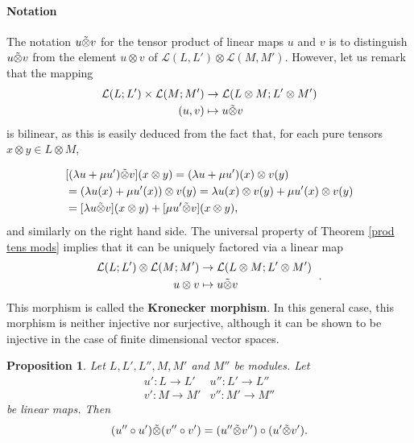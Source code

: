 \documentclass{report}
\newtheorem{prop}{Proposition}
\theoremstyle{definition}
\theoremstyle{remark}
\begin{document}
\paragraph{Notation} The notation $u \Tilde{\otimes} v$ for the tensor product of linear maps $u$ and $v$ is to distinguish $u \Tilde{\otimes} v$ from the element $u \otimes v$ of $\mathcal{L}(L,L') \otimes \mathcal{L}(M,M')$. However, let us remark that the mapping
\begin{equation*}
    \begin{split}
        \mathcal{L}(L;L') \times \mathcal{L}(M;M') & \to \mathcal{L}(L\otimes M; L' \otimes M') \\
        (u,v) & \mapsto u \Tilde{\otimes} v
    \end{split}
\end{equation*}
is bilinear, as this is easily deduced from the fact that, for each pure tensors $x \otimes y \in L \otimes M$, 

\begin{equation*}
    \begin{split}
        & [(\lambda u + \mu u') \Tilde{\otimes} v] (x \otimes y) = (\lambda u + \mu u')(x) \otimes v(y) \\
        & = (\lambda u (x) + \mu u'(x))\otimes v(y) = \lambda u(x)\otimes v(y) + \mu u'(x) \otimes v(y) \\
        & = [\lambda u \Tilde{\otimes} v] (x\otimes y) + [\mu u' \Tilde{\otimes} v ](x \otimes y),
    \end{split}
\end{equation*} and similarly on the right hand side. The universal property of Theorem \ref{prod tens mods} implies that it can be uniquely factored via a linear map
\begin{equation*}
    \begin{split}
        \mathcal{L}(L;L') \otimes \mathcal{L}(M;M') &\to \mathcal{L}(L \otimes M; L' \otimes M') \\
        u\otimes v & \mapsto u \Tilde{\otimes}v
    \end{split}\;\ .
\end{equation*}This morphism is called the \textbf{Kronecker morphism}. In this general case, this morphism is neither injective nor surjective, although it can be shown to be injective in the case of finite dimensional vector spaces. 






\begin{prop}
    Let $L,L',L'',M,M'$ and $M''$ be modules. Let 
    \begin{equation*}
    \begin{matrix}
    u': L \to L' & u'': L' \to L'' \\
    v': M \to M' & v'': M' \to M'' 
    \end{matrix}
    \end{equation*}
    be linear maps. Then
    \begin{equation*}
        (u'' \circ u') \Tilde{\otimes} (v'' \circ v') = (u''\Tilde{\otimes} v'')\circ (u' \Tilde{\otimes} v').
    \end{equation*}
\end{prop}    
\end{document}
